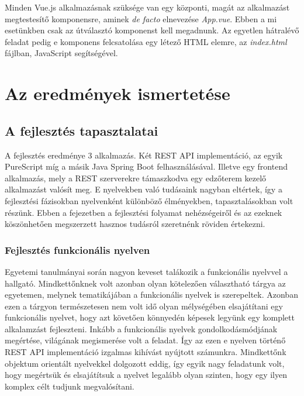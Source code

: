 \documentclass[12pt]{article}
\begin{document}
Minden Vue.js alkalmazásnak szüksége van egy központi, magát az alkalmazást megtestesítő komponensre, aminek \textit{de facto} elnevezése \textit{App.vue}. Ebben a mi esetünkben csak az útválasztó komponenst kell megadnunk. Az egyetlen hátralévő feladat pedig e komponens felcsatolása egy létező HTML elemre, az \textit{index.html} fájlban, JavaScript segítségével.

\newpage
\section{Az eredmények ismertetése}
\subsection{A fejlesztés tapasztalatai}

A fejlesztés eredménye 3 alkalmazás. Két REST API implementáció, az egyik PureScript míg a másik Java Spring Boot felhasználásával. Illetve egy frontend alkalmazás, mely a REST szerverekre támaszkodva egy edzőterem kezelő alkalmazást valósít meg. E nyelvekben való tudásaink nagyban eltértek, így a fejlesztési fázisokban nyelvenként különböző élményekben, tapasztalásokban volt részünk. Ebben a fejezetben a fejlesztési folyamat nehézségeiről és az ezeknek köszönhetően megszerzett hasznos tudásról szeretnénk röviden értekezni.

\subsubsection{Fejlesztés funkcionális nyelven}

Egyetemi tanulmányai során nagyon keveset talákozik a funkcionális nyelvvel a hallgató. Mindkettőnknek volt azonban olyan kötelezően választható tárgya az egyetemen, melynek tematikájában a funkcionális nyelvek is szerepeltek. Azonban ezen a tárgyon természetesen nem volt idő olyan mélységében elsajátítani egy funkcionális nyelvet, hogy azt követően könnyedén képesek legyünk egy komplett alkalamzást fejleszteni. Inkább a funkcionális nyelvek gondolkodásmódjának megértése, világának megismerése volt a feladat. Így az ezen e nyelven történő REST API implementáció izgalmas kihívást nyújtott számunkra. Mindkettőnk objektum orientált nyelvekkel dolgozott eddig, így egyik nagy feladatunk volt, hogy megértsük és elsajátítsuk a nyelvet legalább olyan szinten, hogy egy ilyen komplex célt tudjunk megvalósítani.
\end{document}
